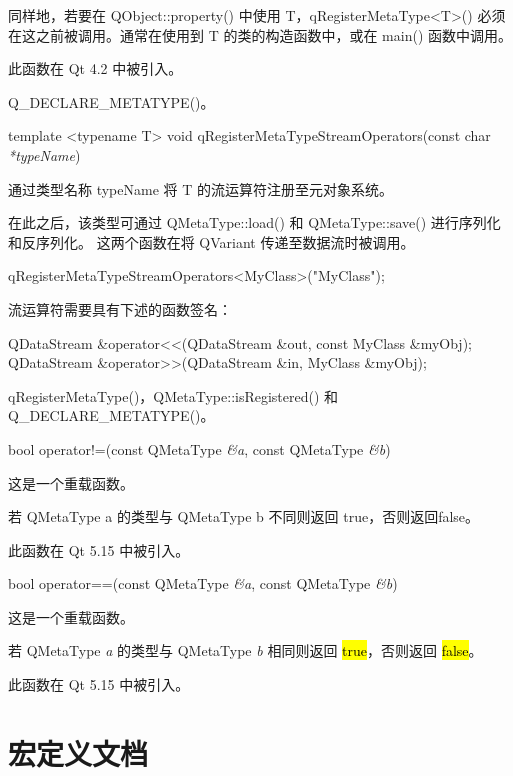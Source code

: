 同样地，若要在 QObject::property() 中使用 T，qRegisterMetaType<T>() 必须在这之前被调用。通常在使用到 T 的类的构造函数中，或在 main() 函数中调用。

此函数在 Qt 4.2 中被引入。

\begin{seeAlso}
Q\_DECLARE\_METATYPE()。
\end{seeAlso}

template <typename T> void qRegisterMetaTypeStreamOperators(const char \emph{*typeName})

通过类型名称 typeName 将 T 的流运算符注册至元对象系统。

在此之后，该类型可通过 QMetaType::load() 和 QMetaType::save() 进行序列化和反序列化。
这两个函数在将 QVariant 传递至数据流时被调用。

\begin{cppcode}
qRegisterMetaTypeStreamOperators<MyClass>("MyClass");
\end{cppcode}

流运算符需要具有下述的函数签名：

\begin{cppcode}
QDataStream &operator<<(QDataStream &out, const MyClass &myObj);
QDataStream &operator>>(QDataStream &in, MyClass &myObj);
\end{cppcode}


\begin{seeAlso}
qRegisterMetaType()，QMetaType::isRegistered() 和 Q\_DECLARE\_METATYPE()。
\end{seeAlso}

bool operator!=(const QMetaType \emph{\&a}, const QMetaType \emph{\&b})

这是一个重载函数。

若 QMetaType a 的类型与 QMetaType b 不同则返回 true，否则返回false。

此函数在 Qt 5.15 中被引入。

bool operator==(const QMetaType \emph{\&a}, const QMetaType \emph{\&b})

这是一个重载函数。

若 QMetaType \emph{a} 的类型与 QMetaType \emph{b} 相同则返回 \hl{true}，否则返回 \hl{false}。

此函数在 Qt 5.15 中被引入。



\section{宏定义文档}

